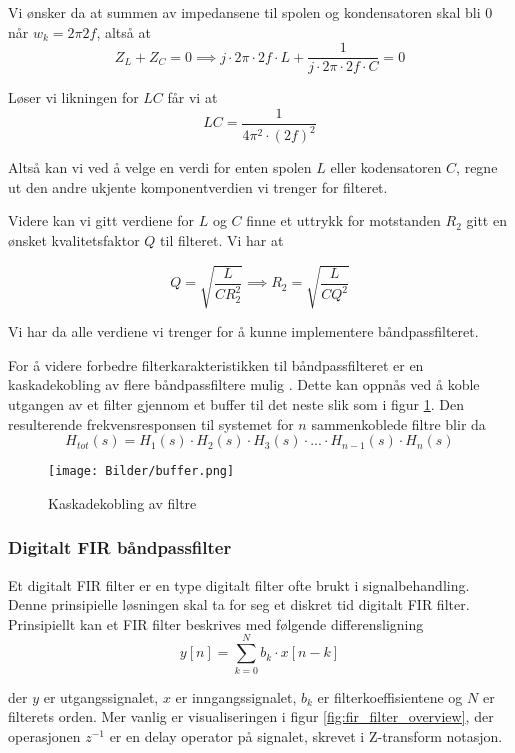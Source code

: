 Vi ønsker da at summen av impedansene til spolen og kondensatoren skal bli 0 når $w_k = 2\pi 2f$, altså at 
\[
    Z_L + Z_C = 0 \implies j \cdot 2\pi \cdot 2f \cdot L + \frac{1}{j \cdot 2\pi \cdot 2f \cdot C} = 0
\]

Løser vi likningen for $LC$ får vi at 
\[
    LC = \frac{1}{4\pi^2 \cdot (2f)^2}
\]

Altså kan vi ved å velge en verdi for enten spolen $L$ eller kodensatoren $C$, regne ut 
den andre ukjente komponentverdien vi trenger for filteret.

Videre kan vi gitt verdiene for $L$ og $C$ finne et uttrykk for motstanden $R_2$ gitt en ønsket 
kvalitetsfaktor $Q$ til filteret. Vi har at 

\[
    Q = \sqrt{\frac{L}{C R_2^2}} \implies R_2 = \sqrt{\frac{L}{C Q^2}}
\]

Vi har da alle verdiene vi trenger for å kunne implementere båndpassfilteret.

For å videre forbedre filterkarakteristikken til båndpassfilteret er en kaskadekobling av flere båndpassfiltere mulig \cite{design3}.
Dette kan oppnås ved å koble utgangen av et filter gjennom et buffer til det neste slik som i figur \ref{fig:cascade}. Den resulterende frekvensresponsen til 
systemet for $n$ sammenkoblede filtre blir da 
\[
    H_{tot}(s) = H_1(s) \cdot H_2(s) \cdot H_3(s) \cdot ... \cdot H_{n-1}(s) \cdot H_n(s)
\]

\begin{figure}[H]
    \centering
    \texttt{[image: Bilder/buffer.png]}
    \caption{Kaskadekobling av filtre \cite{design3}}
    \label{fig:cascade}
\end{figure}

\subsubsection{Digitalt FIR båndpassfilter}
Et digitalt FIR filter er en type digitalt filter ofte brukt i signalbehandling. Denne prinsipielle løsningen 
skal ta for seg et diskret tid digitalt FIR filter. Prinsipiellt kan et FIR filter beskrives med følgende differensligning
\[
    y[n] = \sum_{k=0}^{N} b_k \cdot x[n-k]
\]

der $y$ er utgangssignalet, $x$ er inngangssignalet, $b_k$ er filterkoeffisientene og $N$ er filterets orden. Mer vanlig 
er visualiseringen i figur \ref{fig:fir_filter_overview}, der operasjonen $z^{-1}$ er en delay operator på signalet, skrevet i Z-transform notasjon.

